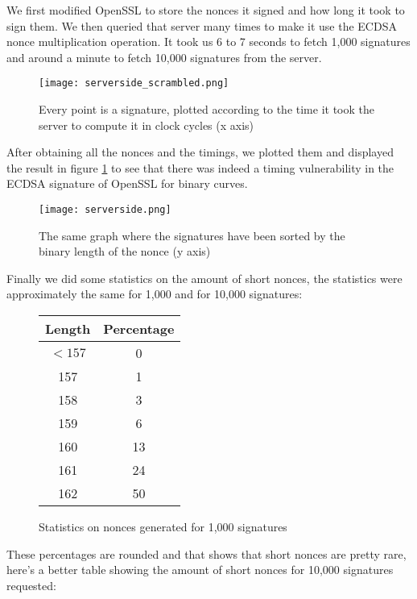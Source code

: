 \documentclass[a4paper,11pt]{article}
\begin{document}
We first modified OpenSSL to store the nonces it signed and how long it took to sign them. We then queried that server many times to make it use the ECDSA nonce multiplication operation. It took us 6 to 7 seconds to fetch 1,000 signatures and around a minute to fetch 10,000 signatures from the server.

\begin{figure}[H]
\texttt{[image: serverside\_scrambled.png]}
\caption{Every point is a signature, plotted according to the time it took the server to compute it in clock cycles (x axis)}
\end{figure}

After obtaining all the nonces and the timings, we plotted them and displayed the result in figure \ref{fig:serverside} to see that there was indeed a timing vulnerability in the ECDSA signature of OpenSSL for binary curves.

\begin{figure}[H]
\texttt{[image: serverside.png]}
\caption{The same graph where the signatures have been sorted by the binary length of the nonce (y axis)}
\label{fig:serverside}
\end{figure}

Finally we did some statistics on the amount of short nonces, the statistics were approximately the same for 1,000 and for 10,000 signatures:

\begin{figure}[H]
\begin{center} 
\begin{tabular}{@{} *2c @{}}
\toprule
 Length & Percentage \\ 
\midrule
$<157$&     0          \\
157&     1          \\
158&     3          \\
159&     6          \\
160&       13         \\
161&     24         \\
162&        50
\bottomrule
\end{tabular}
\end{center} 
\caption{Statistics on nonces generated for 1,000 signatures}
\end{figure}
These percentages are rounded and that shows that short nonces are pretty rare, here's a better table showing the amount of short nonces for 10,000 signatures requested:
\end{document}
